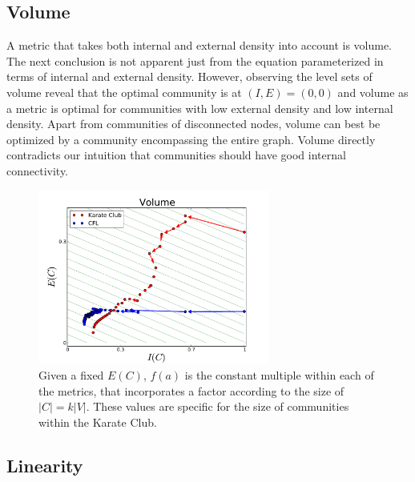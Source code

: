 \documentclass[conference]{IEEEtran}
\begin{document}
\subsection{Volume}
A metric that takes both internal and external density into account is volume.  The next conclusion is not apparent just from the equation parameterized in terms of internal and external density.  However, observing the level sets of volume reveal that the optimal community is at $(I, E) = (0, 0)$ and volume as a metric is optimal for communities with low external density and low internal density.  Apart from communities of disconnected nodes, volume can best be optimized by a community encompassing the entire graph.  Volume directly contradicts our intuition that communities should have good internal connectivity.
\begin{figure}[!h]
\centering
\includegraphics[width=3in]{Figures/volume}
\caption{Given a fixed $E(C)$, $f(a)$ is the constant multiple within each of the metrics, that incorporates a factor according to the size of $|C| = k|V|$.  These values are specific for the size of communities within the Karate Club.}
\label{fig_volume}
\end{figure}

\subsection{Linearity}
\end{document}
